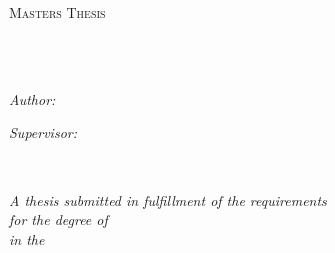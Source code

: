 \documentclass[
11pt, %
english, %
singlespacing, %
headsepline, %
]{style} %
\author{Andre \textsc{Faria}} %
\begin{document}
\frontmatter %

\pagestyle{plain} %


\begin{titlepage}
	\begin{center}

		\vspace*{.06\textheight}
		{\scshape\LARGE \univname\par}\vspace{1.5cm} %
		\textsc{\Large Masters Thesis}\\[0.5cm] %

		\HRule \\[0.4cm] %
		{\huge \bfseries \ttitle\par}\vspace{0.4cm} %
		\HRule \\[1.5cm] %

		\begin{minipage}[t]{0.4\textwidth}
			\begin{flushleft} \large
				\emph{Author:}\\
				\href{https://www.linkedin.com/in/andremmfaria/}{\authorname} %
			\end{flushleft}
		\end{minipage}
		\begin{minipage}[t]{0.4\textwidth}
			\begin{flushright} \large
				\emph{Supervisor:} \\
				\href{https://www.tudublin.ie/explore/faculties-and-schools/computing-digital-data/informatics-and-cybersecurity/people/academic-staff/robertsmith.php}{\supname} %
			\end{flushright}
		\end{minipage}\\[2cm]

		\vfill

		\large \textit{A thesis submitted in fulfillment of the requirements\\ for the degree of \degreename}\\[0.3cm] %
		\textit{in the}\\[0.4cm]
		\deptname\\[2cm] %


\end{center}
\end{titlepage}
\end{document}
